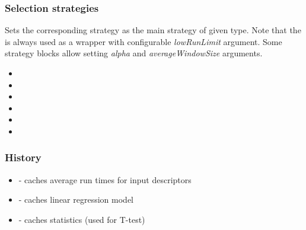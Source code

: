 \documentclass[12pt,a4paper]{report}
\let\openright=\clearpage
\begin{document}
\subsubsection{Selection strategies}
Sets the corresponding strategy as the main strategy of given type. Note that the  is always used as a wrapper with configurable \textit{lowRunLimit} argument. Some strategy blocks allow setting \textit{alpha} and \textit{averageWindowSize} arguments.
\begin{itemize}
	\item {}
	\item {}
	\item {}	
	\item {}
	\item {}
	\item {}
\end{itemize}

\subsubsection{History}
\begin{itemize}
	\item {} - caches average run times for input descriptors
	\item {} - caches linear regression model
	\item {} - caches statistics (used for T-test)
\end{itemize}

\openright
\end{document}
